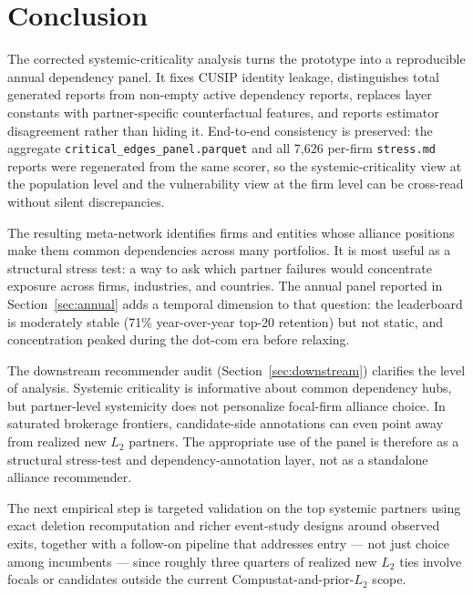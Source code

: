 \documentclass[11pt,letterpaper]{article}
\begin{document}
\section{Conclusion}

The corrected systemic-criticality analysis turns the prototype into a
reproducible annual dependency panel.  It fixes CUSIP identity leakage,
distinguishes total generated reports from non-empty active dependency
reports, replaces layer constants with partner-specific counterfactual
features, and reports estimator disagreement rather than hiding it.
End-to-end consistency is preserved: the aggregate
\texttt{critical\_edges\_panel.parquet} and all 7{,}626 per-firm
\texttt{stress.md} reports were regenerated from the same scorer, so
the systemic-criticality view at the population level and the
vulnerability view at the firm level can be cross-read without
silent discrepancies.

The resulting meta-network identifies firms and entities whose alliance
positions make them common dependencies across many portfolios.  It is
most useful as a structural stress test: a way to ask which partner
failures would concentrate exposure across firms, industries, and
countries.  The annual panel reported in
Section~\ref{sec:annual} adds a temporal dimension to that question:
the leaderboard is moderately stable (71\% year-over-year top-20
retention) but not static, and concentration peaked during the
dot-com era before relaxing.

The downstream recommender audit (Section~\ref{sec:downstream})
clarifies the level of analysis.  Systemic criticality is
informative about common dependency hubs, but partner-level
systemicity does not personalize focal-firm alliance choice.  In
saturated brokerage frontiers, candidate-side annotations can even
point away from realized new $L_2$ partners.  The appropriate use
of the panel is therefore as a structural stress-test and
dependency-annotation layer, not as a standalone alliance recommender.

The next empirical step is targeted validation on the top systemic
partners using exact deletion recomputation and richer event-study
designs around observed exits, together with a follow-on pipeline
that addresses entry --- not just choice among incumbents --- since
roughly three quarters of realized new $L_2$ ties involve focals or
candidates outside the current Compustat-and-prior-$L_2$ scope.
\end{document}
